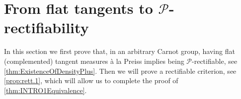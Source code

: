 \documentclass[10pt, a4paper,
oneside, headinclude,footinclude]{scrartcl}
\begin{document}







\section{From flat tangents to $\mathscr{P}$-rectifiability}\label{sec:Density}
In this section we first prove that, in an arbitrary Carnot group, having flat (complemented) tangent measures à la Preiss implies being $\mathscr{P}$-rectifiable, see \cref{thm:ExistenceOfDensityPlus}. Then we will prove a rectifiable criterion, see \cref{prop:rett.1}, which will allow us to complete the proof of \cref{thm:INTRO1Equivalence}. 
\end{document}
